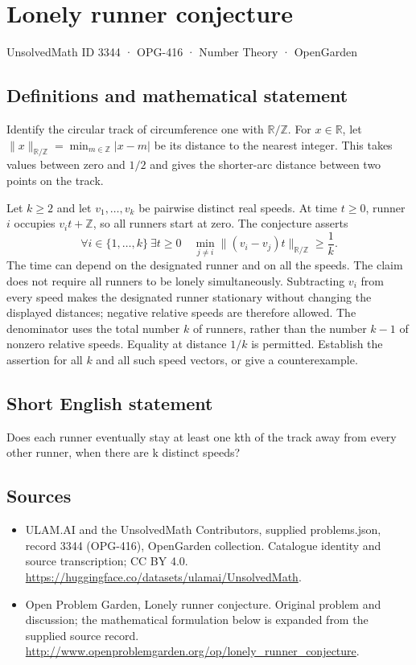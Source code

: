 \documentclass[11pt,a4paper]{article}
\begin{document}
\section*{Lonely runner conjecture}\label{3344}
{\small UnsolvedMath ID 3344 · OPG-416 · Number Theory · OpenGarden}
\subsection{Definitions and mathematical statement}
Identify the circular track of circumference one with $\mathbb R/\mathbb Z$.
For $x\in\mathbb R$, let $\|x\|_{\mathbb R/\mathbb Z}
=\min_{m\in\mathbb Z}|x-m|$ be its distance to the nearest integer.
This takes values between zero and $1/2$ and gives the shorter-arc
distance between two points on the track.

Let $k\ge2$ and let $v_1,\ldots,v_k$ be pairwise distinct real speeds.
At time $t\ge0$, runner $i$ occupies $v_it+\mathbb Z$, so all runners
start at zero. The conjecture asserts
\[
 \forall i\in\{1,\ldots,k\}\ \exists t\ge0\quad
 \min_{j\ne i}\|(v_i-v_j)t\|_{\mathbb R/\mathbb Z}\ge\frac1k.
\]
The time can depend on the designated runner and on all the speeds.
The claim does not require all runners to be lonely simultaneously.
Subtracting $v_i$ from every speed makes the designated runner stationary
without changing the displayed distances; negative relative speeds are
therefore allowed. The denominator uses the total number $k$ of runners,
rather than the number $k-1$ of nonzero relative speeds. Equality at
distance $1/k$ is permitted. Establish the assertion for all $k$ and
all such speed vectors, or give a counterexample.
\subsection{Short English statement}
Does each runner eventually stay at least one kth of the track away from every other runner, when there are k distinct speeds?
\subsection{Sources}
\begin{itemize}
\item[S1] ULAM.AI and the UnsolvedMath Contributors, supplied problems.json, record 3344 (OPG-416), OpenGarden collection. Catalogue identity and source transcription; CC BY 4.0.
\url{https://huggingface.co/datasets/ulamai/UnsolvedMath}.
\item[S2] Open Problem Garden, Lonely runner conjecture. Original problem and discussion; the mathematical formulation below is expanded from the supplied source record.
\url{http://www.openproblemgarden.org/op/lonely_runner_conjecture}.
\end{itemize}
\end{document}
